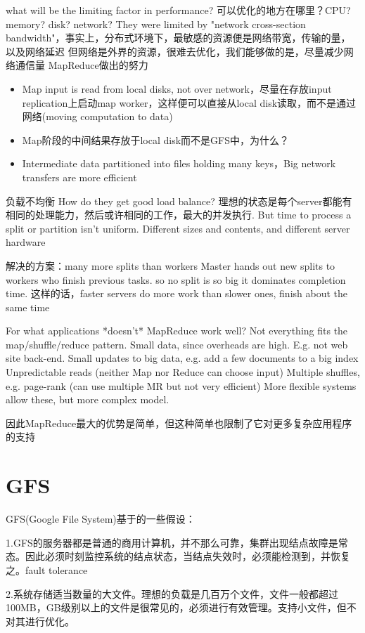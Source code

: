what will be the limiting factor in performance?
可以优化的地方在哪里？CPU? memory? disk? network?
They were limited by "network cross-section bandwidth"，事实上，分布式环境下，最敏感的资源便是网络带宽，传输的量，以及网络延迟
但网络是外界的资源，很难去优化，我们能够做的是，尽量减少网络通信量
MapReduce做出的努力
\begin{itemize}
  \item Map input is read from local disks, not over network，尽量在存放input replication上启动map worker，这样便可以直接从local disk读取，而不是通过网络(moving computation to data)
  \item Map阶段的中间结果存放于local disk而不是GFS中，为什么？
  \item Intermediate data partitioned into files holding many keys，Big network transfers are more efficient
\end{itemize}

负载不均衡
How do they get good load balance?
理想的状态是每个server都能有相同的处理能力，然后或许相同的工作，最大的并发执行.
But time to process a split or partition isn't uniform.
Different sizes and contents, and different server hardware

解决的方案：many more splits than workers
Master hands out new splits to workers who finish previous tasks.
so no split is so big it dominates completion time.
这样的话，faster servers do more work than slower ones, finish about the same time

For what applications *doesn't* MapReduce work well?
  Not everything fits the map/shuffle/reduce pattern.
  Small data, since overheads are high. E.g. not web site back-end.
  Small updates to big data, e.g. add a few documents to a big index
  Unpredictable reads (neither Map nor Reduce can choose input)
  Multiple shuffles, e.g. page-rank (can use multiple MR but not very efficient)
  More flexible systems allow these, but more complex model.

因此MapReduce最大的优势是简单，但这种简单也限制了它对更多复杂应用程序的支持

\section{GFS}
GFS(Google File System)基于的一些假设：

1.GFS的服务器都是普通的商用计算机，并不那么可靠，集群出现结点故障是常态。因此必须时刻监控系统的结点状态，当结点失效时，必须能检测到，并恢复之。fault tolerance

2.系统存储适当数量的大文件。理想的负载是几百万个文件，文件一般都超过100MB，GB级别以上的文件是很常见的，必须进行有效管理。支持小文件，但不对其进行优化。

